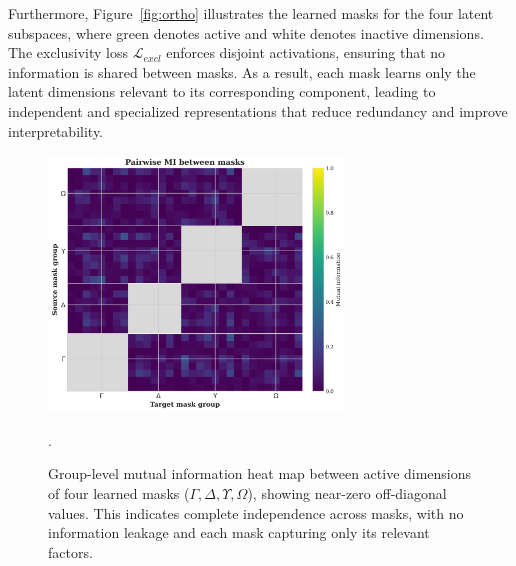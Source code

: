 \documentclass[doubleblind]{ecai}
\begin{document}
	Furthermore, Figure~\ref{fig:ortho} illustrates the learned masks for the four latent subspaces, where green denotes active and white denotes inactive dimensions. The exclusivity loss $\mathcal{L}_{\mathit{excl}}$ enforces disjoint activations, ensuring that no information is shared between masks. As a result, each mask learns only the latent dimensions relevant to its corresponding component, leading to independent and specialized representations that reduce redundancy and improve interpretability.
	
		\begin{figure}[h]
		\centering
		
		\includegraphics[width=0.7\textwidth]{Images/MI.png}
		
		\caption{
			Group-level mutual information heat map between active dimensions of four learned masks (\(\Gamma, \Delta, \Upsilon, \Omega\)), 
			showing near-zero off-diagonal values. This indicates complete independence across masks, with no information leakage 
			and each mask capturing only its relevant factors.
		}
		
		.
		
		
		\label{fig:mi}
		
	\end{figure}
	
	
\end{document}
